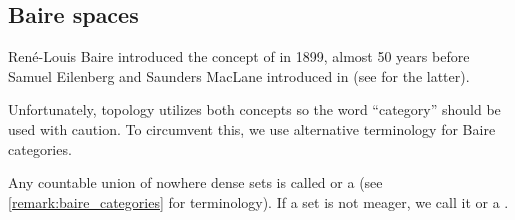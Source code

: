 \subsection{Baire spaces}\label{subsec:baire_spaces}

\begin{remark}\label{remark:baire_categories}
  René-Louis Baire introduced the concept of  in 1899, almost 50 years before Samuel Eilenberg and Saunders MacLane introduced  in \cite{MacLane1945} (see  for the latter).

  Unfortunately, topology utilizes both concepts so the word \enquote{category} should be used with caution. To circumvent this, we use alternative terminology for Baire categories.
\end{remark}

\begin{definition}\label{def:meager_set}\cite[definition 2.1]{Rudin1991}
  Any countable union of nowhere dense sets is called  or a  (see \cref{remark:baire_categories} for terminology). If a set is not meager, we call it  or a .
\end{definition}

